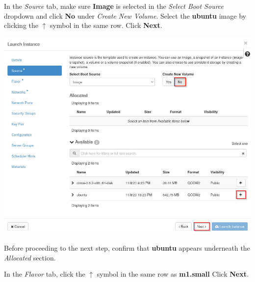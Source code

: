 \documentclass[letterpaper, 12pt]{article}
\begin{document}
\begin{enumerate}
    \begin{labstep}
        In the \textit{Source} tab, make sure \textbf{Image} is selected in the \textit{Select Boot Source} dropdown and click \textbf{No} under \textit{Create New Volume}.
        Select the \textbf{ubuntu} image by clicking the $\uparrow$ symbol in the same row.
        Click \textbf{Next}.

        \begin{center}
            \includegraphics[width=\linewidth]{images/part2/step4.png}
        \end{center}
    \end{labstep}

    \begin{stopbox}
        Before proceeding to the next step, confirm that \textbf{ubuntu} appears underneath the \textit{Allocated} section.
    \end{stopbox}

    \begin{labstep}
        In the \textit{Flavor} tab, click the $\uparrow$ symbol in the same row as \textbf{m1.small}
        Click \textbf{Next}.


\end{labstep}
\end{enumerate}
\end{document}

